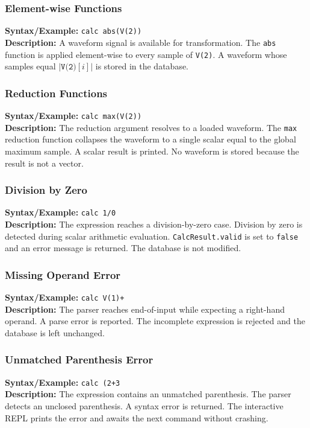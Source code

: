 \subsubsection{Element-wise Functions}
\textbf{Syntax/Example:} \texttt{calc abs(V(2))}\\
\textbf{Description:} A waveform signal is available for transformation. The \texttt{abs} function is applied element-wise to every sample of \texttt{V(2)}. A waveform whose samples equal $|\texttt{V(2)}[i]|$ is stored in the database.

\subsubsection{Reduction Functions}
\textbf{Syntax/Example:} \texttt{calc max(V(2))}\\
\textbf{Description:} The reduction argument resolves to a loaded waveform. The \texttt{max} reduction function collapses the waveform to a single scalar equal to the global maximum sample. A scalar result is printed. No waveform is stored because the result is not a vector.

\subsubsection{Division by Zero}
\textbf{Syntax/Example:} \texttt{calc 1/0}\\
\textbf{Description:} The expression reaches a division-by-zero case. Division by zero is detected during scalar arithmetic evaluation. \texttt{CalcResult.valid} is set to \texttt{false} and an error message is returned. The database is not modified.

\subsubsection{Missing Operand Error}
\textbf{Syntax/Example:} \texttt{calc V(1)+}\\
\textbf{Description:} The parser reaches end-of-input while expecting a right-hand operand. A parse error is reported. The incomplete expression is rejected and the database is left unchanged.

\subsubsection{Unmatched Parenthesis Error}
\textbf{Syntax/Example:} \texttt{calc (2+3}\\
\textbf{Description:} The expression contains an unmatched parenthesis. The parser detects an unclosed parenthesis. A syntax error is returned. The interactive REPL prints the error and awaits the next command without crashing.


